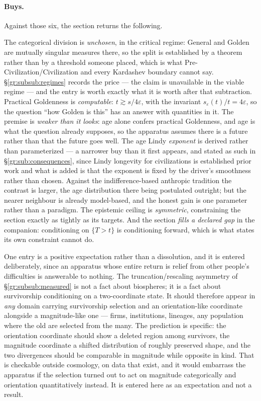 \documentclass[11pt]{article}
\numberwithin{equation}{section}
\theoremstyle{plain}
\theoremstyle{definition}
\theoremstyle{remark}
\begin{document}
\paragraph{Buys.} Against those six, the section returns the following.

The categorical division is \emph{unchosen}, in the critical regime:
General and Golden are mutually singular measures there, so the split is
established by a theorem rather than by a threshold someone placed,
which is what Pre-Civilization/Civilization and every Kardashev boundary
cannot say. \S\ref{gr:subsub:regimes} records the price --- the claim is
unavailable in the viable regime --- and the entry is worth exactly what
it is worth after that subtraction.
Practical Goldenness is \emph{computable}: $t \gtrsim s/4\varepsilon$,
with the invariant $s_\varepsilon(t)/t = 4\varepsilon$, so the question
``how Golden is this'' has an answer with quantities in it. The premise
is \emph{weaker than it looks}: age alone confers practical Goldenness,
and age is what the question already supposes, so the apparatus assumes
there is a future rather than that the future goes well. The age
Lindy \emph{exponent} is derived rather than parameterized --- a
narrower buy than it first appears, and stated as such in
\S\ref{gr:sub:consequences}, since Lindy longevity for civilizations is
established prior work \cite{BC21,BG24,Kip20,Ord23} and what is added is
that the exponent is fixed by the driver's smoothness rather than
chosen. Against the indifference-based anthropic tradition
\cite{Car83,Got93,Bos02} the contrast is larger, the age distribution
there being postulated outright; but the nearer neighbour is already
model-based, and the honest gain is one parameter rather than a
paradigm.
The epistemic ceiling is \emph{symmetric}, constraining the section
exactly as tightly as its targets. And the section \emph{fills a
declared gap} in the companion: conditioning on $\{T>t\}$ is
conditioning forward, which is what \cite{Ben26Optimal} states its own
constraint cannot do.

One entry is a positive expectation rather than a dissolution, and it is
entered deliberately, since an apparatus whose entire return is relief
from other people's difficulties is answerable to nothing. The
truncation/rescaling asymmetry of \S\ref{gr:subsub:measured} is not a
fact about biospheres; it is a fact about survivorship conditioning on a
two-coordinate state. It should therefore appear in \emph{any} domain
carrying survivorship selection and an orientation-like coordinate
alongside a magnitude-like one --- firms, institutions, lineages, any
population where the old are selected from the many. The prediction is
specific: the orientation coordinate should show a deleted region among
survivors, the magnitude coordinate a shifted distribution of roughly
preserved shape, and the two divergences should be comparable in
magnitude while opposite in kind. That is checkable outside cosmology,
on data that exist, and it would embarrass the apparatus if the
selection turned out to act on magnitude categorically and orientation
quantitatively instead. It is entered here as an expectation and not a
result.
\end{document}
